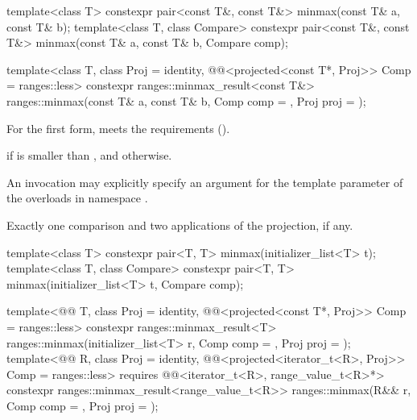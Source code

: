 %
\begin{itemdecl}
template<class T>
  constexpr pair<const T&, const T&> minmax(const T& a, const T& b);
template<class T, class Compare>
  constexpr pair<const T&, const T&> minmax(const T& a, const T& b, Compare comp);

template<class T, class Proj = identity,
         @@<projected<const T*, Proj>> Comp = ranges::less>
  constexpr ranges::minmax_result<const T&>
    ranges::minmax(const T& a, const T& b, Comp comp = {}, Proj proj = {});
\end{itemdecl}


\begin{itemdescr}
\pnum
\expects
For the first form,  meets the
 requirements ().

\pnum
\returns
{} if  is smaller than , and
 otherwise.

\pnum
\remarks
An invocation may explicitly specify
an argument for the template parameter 
of the overloads in namespace .

\pnum
\complexity
Exactly one comparison and two applications of the projection, if any.
\end{itemdescr}

%
\begin{itemdecl}
template<class T>
  constexpr pair<T, T> minmax(initializer_list<T> t);
template<class T, class Compare>
  constexpr pair<T, T> minmax(initializer_list<T> t, Compare comp);

template<@@ T, class Proj = identity,
         @@<projected<const T*, Proj>> Comp = ranges::less>
  constexpr ranges::minmax_result<T>
    ranges::minmax(initializer_list<T> r, Comp comp = {}, Proj proj = {});
template<@@ R, class Proj = identity,
         @@<projected<iterator_t<R>, Proj>> Comp = ranges::less>
  requires @@<iterator_t<R>, range_value_t<R>*>
  constexpr ranges::minmax_result<range_value_t<R>>
    ranges::minmax(R&& r, Comp comp = {}, Proj proj = {});
\end{itemdecl}

